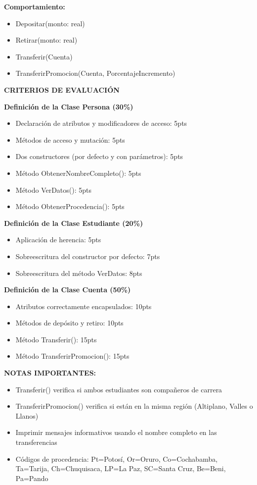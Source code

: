 \documentclass[8pt]{article}
\begin{document}
\begin{multicols}{2}
\textbf{Comportamiento:}
\begin{itemize}[leftmargin=10pt, itemsep=0pt]
    \item Depositar(monto: real)
    \item Retirar(monto: real)
    \item Transferir(Cuenta)
    \item TransferirPromocion(Cuenta, PorcentajeIncremento)
\end{itemize}

\textbf{CRITERIOS DE EVALUACIÓN}

\textbf{Definición de la Clase Persona (30\%)}
\begin{itemize}[leftmargin=12pt, itemsep=0pt]
    \item Declaración de atributos y modificadores de acceso: 5pts
    \item Métodos de acceso y mutación: 5pts
    \item Dos constructores (por defecto y con parámetros): 5pts
    \item Método ObtenerNombreCompleto(): 5pts
    \item Método VerDatos(): 5pts
    \item Método ObtenerProcedencia(): 5pts
\end{itemize}

\textbf{Definición de la Clase Estudiante (20\%)}
\begin{itemize}[leftmargin=12pt, itemsep=0pt]
    \item Aplicación de herencia: 5pts
    \item Sobreescritura del constructor por defecto: 7pts
    \item Sobreescritura del método VerDatos: 8pts
\end{itemize}

\textbf{Definición de la Clase Cuenta (50\%)}
\begin{itemize}[leftmargin=12pt, itemsep=0pt]
    \item Atributos correctamente encapsulados: 10pts
    \item Métodos de depósito y retiro: 10pts
    \item Método Transferir(): 15pts
    \item Método TransferirPromocion(): 15pts
\end{itemize}

\textbf{NOTAS IMPORTANTES:}
\begin{itemize}[leftmargin=12pt, itemsep=0pt]
    \item Transferir() verifica si ambos estudiantes son compañeros de carrera
    \item TransferirPromocion() verifica si están en la misma región (Altiplano, Valles o Llanos)
    \item Imprimir mensajes informativos usando el nombre completo en las transferencias
    \item Códigos de procedencia: Pt=Potosí, Or=Oruro, Co=Cochabamba, Ta=Tarija, Ch=Chuquisaca, LP=La Paz, SC=Santa Cruz, Be=Beni, Pa=Pando
\end{itemize}


\end{multicols}
\end{document}
